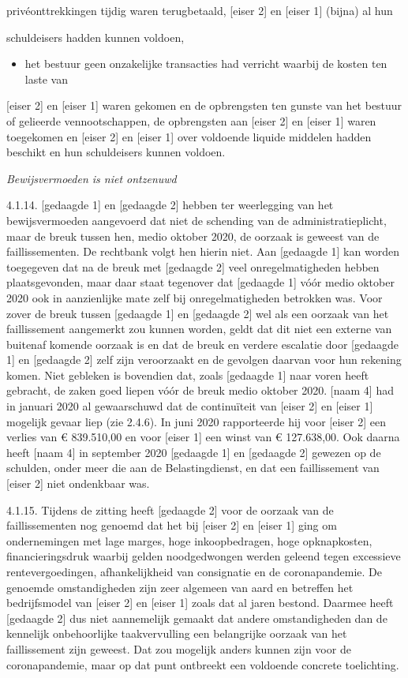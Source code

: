 \documentclass[
  dutch,
  a4paper,
]{article}
\providecommand{\tightlist}{%
  \setlength{\itemsep}{0pt}\setlength{\parskip}{0pt}}
\begin{document}
privéonttrekkingen tijdig waren terugbetaald, {[}eiser 2{]} en {[}eiser 1{]} (bijna) al hun

schuldeisers hadden kunnen voldoen,

\begin{itemize}
\tightlist
\item
  het bestuur geen onzakelijke transacties had verricht waarbij de kosten ten laste van
\end{itemize}

{[}eiser 2{]} en {[}eiser 1{]} waren gekomen en de opbrengsten ten gunste van het bestuur of gelieerde vennootschappen, de opbrengsten aan {[}eiser 2{]} en {[}eiser 1{]} waren toegekomen en {[}eiser 2{]} en {[}eiser 1{]} over voldoende liquide middelen hadden beschikt en hun schuldeisers kunnen voldoen.

\emph{Bewijsvermoeden is niet ontzenuwd}

4.1.14. {[}gedaagde 1{]} en {[}gedaagde 2{]} hebben ter weerlegging van het bewijsvermoeden aangevoerd dat niet de schending van de administratieplicht, maar de breuk tussen hen, medio oktober 2020, de oorzaak is geweest van de faillissementen. De rechtbank volgt hen hierin niet. Aan {[}gedaagde 1{]} kan worden toegegeven dat na de breuk met {[}gedaagde 2{]} veel onregelmatigheden hebben plaatsgevonden, maar daar staat tegenover dat {[}gedaagde 1{]} vóór medio oktober 2020 ook in aanzienlijke mate zelf bij onregelmatigheden betrokken was. Voor zover de breuk tussen {[}gedaagde 1{]} en {[}gedaagde 2{]} wel als een oorzaak van het faillissement aangemerkt zou kunnen worden, geldt dat dit niet een externe van buitenaf komende oorzaak is en dat de breuk en verdere escalatie door {[}gedaagde 1{]} en {[}gedaagde 2{]} zelf zijn veroorzaakt en de gevolgen daarvan voor hun rekening komen. Niet gebleken is bovendien dat, zoals {[}gedaagde 1{]} naar voren heeft gebracht, de zaken goed liepen vóór de breuk medio oktober 2020. {[}naam 4{]} had in januari 2020 al gewaarschuwd dat de continuïteit van {[}eiser 2{]} en {[}eiser 1{]} mogelijk gevaar liep (zie 2.4.6). In juni 2020 rapporteerde hij voor {[}eiser 2{]} een verlies van € 839.510,00 en voor {[}eiser 1{]} een winst van € 127.638,00. Ook daarna heeft {[}naam 4{]} in september 2020 {[}gedaagde 1{]} en {[}gedaagde 2{]} gewezen op de schulden, onder meer die aan de Belastingdienst, en dat een faillissement van {[}eiser 2{]} niet ondenkbaar was.

4.1.15. Tijdens de zitting heeft {[}gedaagde 2{]} voor de oorzaak van de faillissementen nog genoemd dat het bij {[}eiser 2{]} en {[}eiser 1{]} ging om ondernemingen met lage marges, hoge inkoopbedragen, hoge opknapkosten, financieringsdruk waarbij gelden noodgedwongen werden geleend tegen excessieve rentevergoedingen, afhankelijkheid van consignatie en de coronapandemie. De genoemde omstandigheden zijn zeer algemeen van aard en betreffen het bedrijfsmodel van {[}eiser 2{]} en {[}eiser 1{]} zoals dat al jaren bestond. Daarmee heeft {[}gedaagde 2{]} dus niet aannemelijk gemaakt dat andere omstandigheden dan de kennelijk onbehoorlijke taakvervulling een belangrijke oorzaak van het faillissement zijn geweest. Dat zou mogelijk anders kunnen zijn voor de coronapandemie, maar op dat punt ontbreekt een voldoende concrete toelichting.
\end{document}
